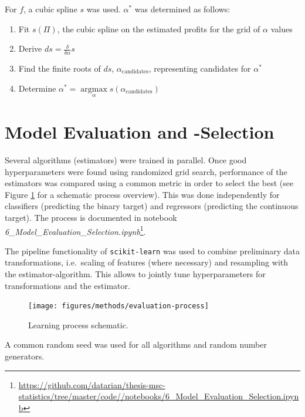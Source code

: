 \documentclass[
  11pt,
  a4paper,
  DIV=12,captions=tableheading,oneside,titlepage]{scrbook}
\providecommand{\tightlist}{%
  \setlength{\itemsep}{0pt}\setlength{\parskip}{0pt}}
\begin{document}
For \(f\), a cubic spline \(s\) was used. \(\alpha^*\) was determined as follows:

\begin{enumerate}
\def\labelenumi{\arabic{enumi}.}
\tightlist
\item
  Fit \(s(\Pi)\), the cubic spline on the estimated profits for the grid of \(\alpha\) values
\item
  Derive \(ds = \frac{\delta}{\delta \alpha} s\)
\item
  Find the finite roots of \(ds\), \(\alpha_{\text{candidates}}\), representing candidates for \(\alpha^*\)
\item
  Determine \(\alpha^* = \underset{\alpha}{\operatorname{argmax}} s(\alpha_{\text{candidates}})\)
\end{enumerate}

\hypertarget{eval-and-select}{%
\section{Model Evaluation and -Selection}\label{eval-and-select}}

Several algorithms (estimators) were trained in parallel. Once good hyperparameters were found using randomized grid search, performance of the estimators was compared using a common metric in order to select the best (see Figure \ref{fig:evaluation-selection} for a schematic process overview). This was done independently for classifiers (predicting the binary target) and regressors (predicting the continuous target). The process is documented in notebook \emph{6\_Model\_Evaluation\_Selection.ipynb}\footnote{\url{https://github.com/datarian/thesis-msc-statistics/tree/master/code//notebooks/6_Model_Evaluation_Selection.ipynb}}.

The pipeline functionality of \texttt{scikit-learn} was used to combine preliminary data transformations, i.e.~scaling of features (where necessary) and resampling with the estimator-algorithm. This allows to jointly tune hyperparameters for transformations and the estimator.

\begin{figure}

{\centering \texttt{[image: figures/methods/evaluation-process]} 

}

\caption{Learning process schematic.}\label{fig:evaluation-selection}
\end{figure}

A common random seed was used for all algorithms and random number generators.
\end{document}
